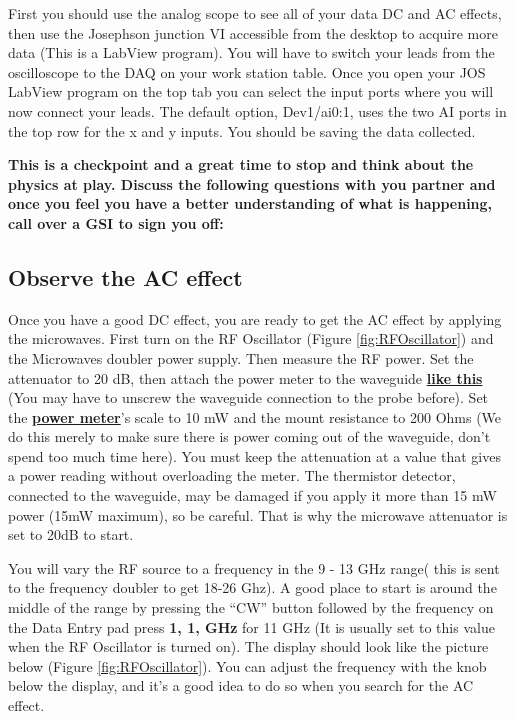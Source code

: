 \documentclass{../lab}
\begin{document}
First you should use the analog scope to see all of your data DC and AC effects, then use the Josephson junction VI accessible from the desktop to acquire more data (This is a LabView program). You will have to switch your leads from the oscilloscope to the DAQ on your work station table. Once you open your JOS LabView program on the top tab you can select the input ports where you will now connect your leads. The default option, Dev1/ai0:1, uses the two AI ports in the top row for the x and y inputs. You should be saving the data collected.

\textbf{This is a checkpoint and a great time to stop and think about the physics at play. Discuss the following questions with you partner and once you feel you have a better understanding of what is happening, call over a GSI to sign you off:}\\


\subsection{Observe the AC effect}

Once you have a good DC effect, you are ready to get the AC effect by applying the microwaves. First turn on the RF Oscillator (Figure \ref{fig:RFOscillator}) and the Microwaves doubler power supply. Then measure the RF power. Set the attenuator to 20 dB, then attach the power meter to the waveguide \href{http://experimentationlab.berkeley.edu/sites/default/files/JOS/waveguide.jpeg}{\textbf{like this}} (You may have to unscrew the waveguide connection to the probe before). Set the \href{http://experimentationlab.berkeley.edu/sites/default/files/JOS/image.jpeg}{\textbf{power meter}}'s scale to 10 mW and the mount resistance to 200 Ohms (We do this merely to make sure there is power coming out of the waveguide, don't spend too much time here). You must keep the attenuation at a value that gives a power reading without overloading the meter. The thermistor detector, connected to the waveguide, may be damaged if you apply it more than 15 mW power (15mW maximum), so be careful. That is why the microwave attenuator is set to 20dB to start.

You will vary the RF source to a frequency in the 9 - 13 GHz range( this is sent to the frequency doubler to get 18-26 Ghz). A good place to start is around the middle of the range by pressing the ``CW'' button followed by the frequency on the Data Entry pad press\textbf{ 1, 1, GHz} for 11 GHz (It is usually set to this value when the RF Oscillator is turned on). The display should look like the picture below (Figure \ref{fig:RFOscillator}). You can adjust the frequency with the knob below the display, and it's a good idea to do so when you search for the AC effect.
\end{document}
